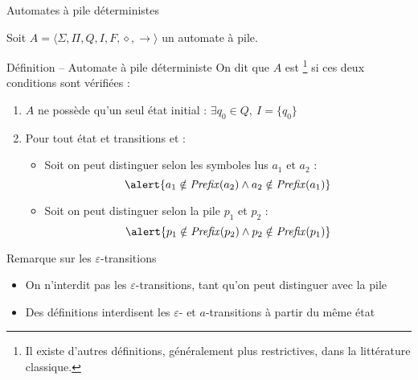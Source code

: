 
\begingroup

\begin{frame}{Automates à pile déterministes}

  Soit $A = \langle \Sigma, \Pi, Q, I, F, \diamond, \rightarrow \rangle$ un automate à pile.

  \begin{block}{Définition -- Automate à pile déterministe}
    On dit que $A$ est \footnote[frame]{Il existe d'autres définitions, généralement plus restrictives, dans la littérature classique.} si ces deux conditions sont vérifiées : 
    \begin{enumerate}
    \item $A$ ne possède qu'un seul état initial : \alert{$\exists q_0\in Q,~I = \{q_0\}$}
    \item Pour tout état  et transitions 
      et  :
      \begin{itemize}
      \item\vspace{2mm} Soit on peut distinguer selon les symboles lus $a_1$ et $a_2$ :
        $$\alert{a_1 \notin \mathit{Prefix}(a_2) \land a_2 \notin \mathit{Prefix}(a_1)}$$
      \item Soit on peut distinguer selon la pile  $p_1$ et $p_2$ :
        $$\alert{p_1 \notin \mathit{Prefix}(p_2) \land p_2 \notin \mathit{Prefix}(p_1)}$$
      \end{itemize}
    \end{enumerate}
  \end{block}

  \begin{block}{Remarque sur les $\varepsilon$-transitions}
    \begin{itemize}
    \item On n'interdit pas les $\varepsilon$-transitions, tant qu'on peut distinguer avec la pile
    \item Des définitions interdisent les $\varepsilon$- et $a$-transitions à partir du même état
    \end{itemize}
  \end{block}

\end{frame}


\endgroup
